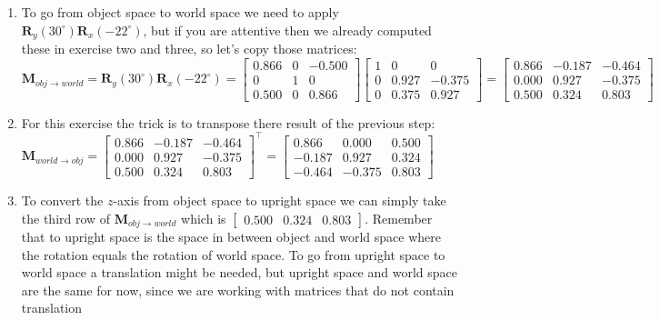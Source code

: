 \documentclass[11pt]{article}
\begin{document}
\begin{enumerate}
	\item %
To go from object space to world space we need to apply $\textbf{R}_y(30^\circ)\textbf{R}_x(-22^\circ)$, but if you are attentive then we already computed these in exercise two and three, so let's copy those matrices:
$\textbf{M}_{obj\to{}world}=\textbf{R}_y(30^\circ)\textbf{R}_x(-22^\circ)=
\begin{bmatrix}
0.866 & 0 & -0.500 \\
0 & 1 & 0 \\
0.500 & 0 & 0.866
\end{bmatrix}
\begin{bmatrix}
1 & 0 & 0 \\
0 & 0.927 & -0.375 \\
0 & 0.375 & 0.927
\end{bmatrix}=
\begin{bmatrix}
0.866 & -0.187 & -0.464 \\
0.000 & 0.927 & -0.375 \\
0.500 & 0.324 & 0.803
\end{bmatrix}
$

	\item %
For this exercise the trick is to transpose there result of the previous step: \\
$\textbf{M}_{world\to{}obj}=
\begin{bmatrix}
0.866 & -0.187 & -0.464 \\
0.000 & 0.927 & -0.375 \\
0.500 & 0.324 & 0.803
\end{bmatrix}^\intercal=
\begin{bmatrix}
0.866 & 0.000 & 0.500 \\
-0.187 & 0.927 & 0.324 \\
-0.464 & -0.375 & 0.803
\end{bmatrix}
$
	\item %
To convert the $z$-axis from object space to upright space we can simply take the third row of $\textbf{M}_{obj\to{}world}$ which is $\begin{bmatrix}
0.500 & 0.324 & 0.803
\end{bmatrix}$. Remember that to upright space is the space in between object and world space where the rotation equals the rotation of world space. To go from upright space to world space a translation might be needed, but upright space and world space are the same for now, since we are working with matrices that do not contain translation 

\end{enumerate}
\end{document}
